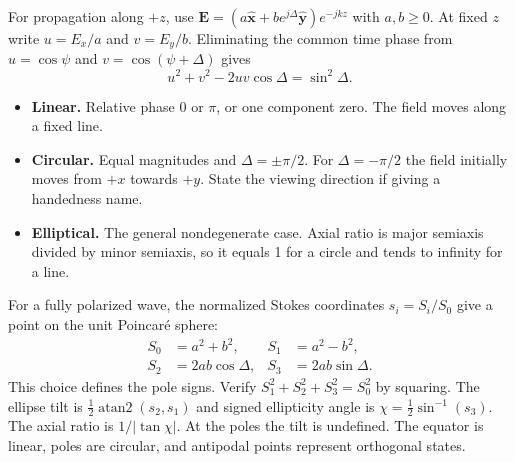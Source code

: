 \documentclass[12pt,a4paper]{article}
\begin{document}
For propagation along $+z$, use $\mathbf E=(a\hat{\mathbf x}+be^{j\Delta}\hat{\mathbf y})e^{-jkz}$ with $a,b\ge0$. At fixed $z$ write $u=E_x/a$ and $v=E_y/b$. Eliminating the common time phase from $u=\cos\psi$ and $v=\cos(\psi+\Delta)$ gives
\[
u^2+v^2-2uv\cos\Delta=\sin^2\Delta .
\]
\begin{itemize}[leftmargin=*,itemsep=3pt]
\item \textbf{Linear.} Relative phase $0$ or $\pi$, or one component zero. The field moves along a fixed line.
\item \textbf{Circular.} Equal magnitudes and $\Delta=\pm\pi/2$. For $\Delta=-\pi/2$ the field initially moves from $+x$ towards $+y$. State the viewing direction if giving a handedness name.
\item \textbf{Elliptical.} The general nondegenerate case. Axial ratio is major semiaxis divided by minor semiaxis, so it equals 1 for a circle and tends to infinity for a line.
\end{itemize}
For a fully polarized wave, the normalized Stokes coordinates $s_i=S_i/S_0$ give a point on the unit Poincar\'e sphere:
\[
\begin{aligned}
S_0 &= a^2+b^2,&S_1 &=a^2-b^2,\\
S_2 &=2ab\cos\Delta,& S_3 &=2ab\sin\Delta .
\end{aligned}
\]
This choice defines the pole signs. Verify $S_1^2+S_2^2+S_3^2=S_0^2$ by squaring. The ellipse tilt is $\tfrac12\operatorname{atan2}(s_2,s_1)$ and signed ellipticity angle is $\chi=\tfrac12\sin^{-1}(s_3)$. The axial ratio is $1/|\tan\chi|$. At the poles the tilt is undefined. The equator is linear, poles are circular, and antipodal points represent orthogonal states.
\begin{tcolorbox}[tikzbox,title={Poincar\'e sphere for the stated Stokes convention},unbreakable]
\centering
{}
\end{tcolorbox}
\end{document}
